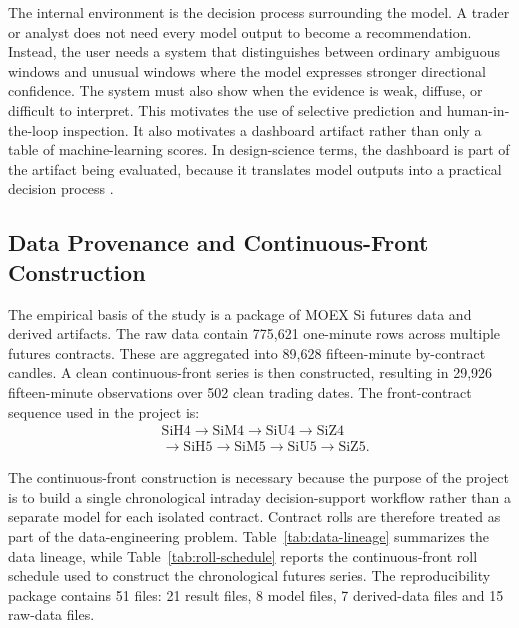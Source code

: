 The internal environment is the decision process surrounding the model. A trader or analyst does not need every model output to become a recommendation. Instead, the user needs a system that distinguishes between ordinary ambiguous windows and unusual windows where the model expresses stronger directional confidence. The system must also show when the evidence is weak, diffuse, or difficult to interpret. This motivates the use of selective prediction and human-in-the-loop inspection. It also motivates a dashboard artifact rather than only a table of machine-learning scores. In design-science terms, the dashboard is part of the artifact being evaluated, because it translates model outputs into a practical decision process \cite{hevner_dsr,peffers_dsrm,venable_feds}.

\subsection{Data Provenance and Continuous-Front Construction}
\label{subsec:data_provenance}





The empirical basis of the study is a package of MOEX Si futures data and derived artifacts. The raw data contain 775,621 one-minute rows across multiple futures contracts. These are aggregated into 89,628 fifteen-minute by-contract candles. A clean continuous-front series is then constructed, resulting in 29,926 fifteen-minute observations over 502 clean trading dates. The front-contract sequence used in the project is:
\[
\begin{aligned}
&\text{SiH4} \rightarrow \text{SiM4} \rightarrow \text{SiU4} \rightarrow \text{SiZ4}\\
&\rightarrow \text{SiH5} \rightarrow \text{SiM5} \rightarrow \text{SiU5} \rightarrow \text{SiZ5}.
\end{aligned}
\]

The continuous-front construction is necessary because the purpose of the project is to build a single chronological intraday decision-support workflow rather than a separate model for each isolated contract. Contract rolls are therefore treated as part of the data-engineering problem. Table~\ref{tab:data-lineage} summarizes the data lineage, while Table~\ref{tab:roll-schedule} reports the continuous-front roll schedule used to construct the chronological futures series. The reproducibility package contains 51 files: 21 result files, 8 model files, 7 derived-data files and 15 raw-data files.

